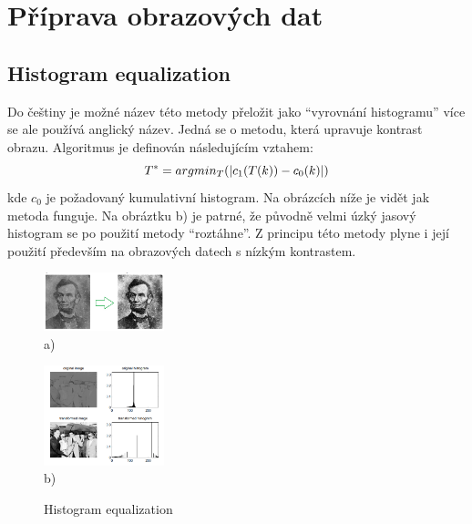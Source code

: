 \documentclass{thesis}%
\begin{document}
\chapter{Příprava obrazových dat}

\section{Histogram equalization}
Do češtiny je možné název této metody přeložit jako ``vyrovnání histogramu'' více se ale používá anglický název. Jedná se o metodu, která upravuje kontrast obrazu. Algoritmus je definován následujícím vztahem:
\begin{equation}
 \centering
 T^{*} = argmin_{T}(|c_{1}(T(k)) - c_{0}(k)|)
\end{equation}
kde $c_{0}$ je požadovaný kumulativní histogram. Na obrázcích níže je vidět jak metoda funguje. Na obráztku b) je patrné, že původně velmi úzký jasový histogram se po použití metody ``roztáhne''. Z principu této metody plyne i její použití především na obrazových datech s nízkým kontrastem.
 \begin{figure}[htp!]
  \centering
  
   \begin{minipage}[c]{\textwidth}
	\centering\includegraphics[width=3.5cm]{histeq.png}\\
     a)
   \end{minipage}
    \begin{minipage}[c]{\textwidth}
	\centering\includegraphics[width=3.5cm]{histeq2.png}\\
     b)
   \end{minipage}

	\caption[Histogram equalization]{Histogram equalization}
\end{figure}
\newpage
\end{document}
